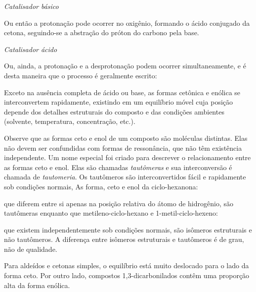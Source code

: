 \noindent \textit{Catalisador básico}

\noindent Ou então a protonação pode ocorrer no oxigênio, formando o ácido conjugado da cetona, seguindo-se a abstração do próton do carbono pela base. 

\noindent\textit{Catalisador ácido}

\noindent Ou, ainda, a protonação e a desprotonação podem ocorrer simultaneamente, e é desta maneira que o processo é geralmente escrito: 

\noindent Exceto na ausência completa de ácido ou base, as formas cetônica e enólica se interconvertem rapidamente, existindo em um equilíbrio móvel cuja posição depende dos detalhes estruturais do composto e das condições ambientes (solvente, temperatura, concentração, etc.). 

Observe que as formas ceto e enol de um composto são moléculas distintas. Elas não devem ser confundidas com formas de ressonância, que não têm existência independente. Um nome especial foi criado para descrever o relacionamento entre as formas ceto e enol. Elas são chamadas \textit{tautômeras} e sua interconversão é chamada de \textit{tautomeria}. Os tautômeros são interconvertidos fácil e rapidamente sob condições normais, As forma, ceto e enol da ciclo-hexanona:



\noindent que diferem entre si apenas na posição relativa do átomo de hidrogênio, são tautômeras enquanto que metileno-ciclo-hexano e 1-metil-ciclo-hexeno:



\noindent que existem independentemente sob condições normais, são isômeros estruturais e não tautômeros. A diferença entre isômeros estruturais e tautômeros é de grau, não de qualidade.


Para aldeídos e cetonas simples, o equilíbrio está muito deslocado para o lado da forma ceto. Por outro lado, compostos 1,3-dicarbonilados contêm uma proporção alta da forma enólica.

\begin{tightcenter}
    \chemnameinit{}
    \qquad
    \qquad
\end{tightcenter}


